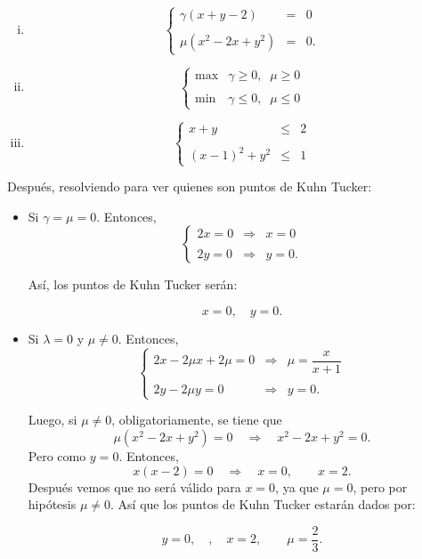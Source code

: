 \begin{enumerate}
\begin{enumerate}[i)]
	    \item $$
		    \left\{
			\begin{array}{rcl}
			    \gamma(x+y-2)& = &0\\\\
			    \mu(x^2-2x+y^2)& = &0.
			\end{array}
		    \right.
		  $$ 

	    \item
		$$
		    \left\{
			\begin{array}{ll}
			     \max & \gamma\geq 0,\; \; \mu\geq 0\\\\
			     \min & \gamma\leq 0,\; \; \mu\leq 0
			\end{array}
		    \right.
		$$
	    \item $$
		    \left\{
			\begin{array}{rcl}
			    x+y&\leq& 2\\\\
			    (x-1)^2+y^2&\leq &1
			\end{array}
		    \right.
		    $$
	\end{enumerate}
	\vspace{.5cm}

	Después, resolviendo para ver quienes son puntos de Kuhn Tucker:\\

	\begin{itemize}
	    \item Si $\gamma = \mu = 0$. Entonces,
		$$\left\{\begin{array}{rcl}
		    2x=0&\Rightarrow &x=0\\\\
		    2y=0&\Rightarrow &y=0.
		\end{array}\right.$$

		Así, los puntos de Kuhn Tucker serán: 
		\begin{tcolorbox}
		    $$x=0,\quad  y=0.$$
		\end{tcolorbox}

	    \item Si $\lambda=0$ y $\mu\neq 0$. Entonces,
		$$\left\{\begin{array}{rcl}
		    2x -2\mu x + 2\mu=0&\Rightarrow &\mu=\dfrac{x}{x+1}\\\\
		    2y-2\mu y=0&\Rightarrow &y=0.
		\end{array}\right.$$

		Luego, si $\mu\neq 0$, obligatoriamente, se tiene que
		$$\mu(x^2-2x+y^2)=0\quad \Rightarrow \quad x^2-2x+y^2=0.$$
		Pero como $y=0$. Entonces,
		$$x(x-2)=0 \quad \Rightarrow \quad x=0,\qquad  x=2.$$
		Después vemos que no será válido para $x=0$, ya que  $\mu=0$, pero por hipótesis $\mu\neq 0$. Así que los puntos de Kuhn Tucker estarán dados por:
		\begin{tcolorbox}
		    $$y=0,\quad,\quad x=2,\quad \quad \mu=\dfrac{2}{3}.$$
		\end{tcolorbox}


\end{itemize}
\end{enumerate}
